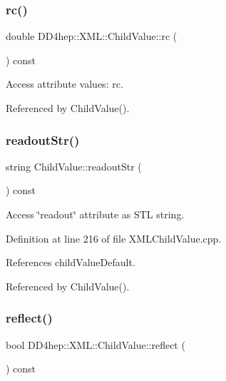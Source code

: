 \subsubsection{\texorpdfstring{rc()}{rc()}}
{\footnotesize\ttfamily double D\+D4hep\+::\+X\+M\+L\+::\+Child\+Value\+::rc (\begin{DoxyParamCaption}{ }\end{DoxyParamCaption}) const}



Access attribute values\+: rc. 



Referenced by Child\+Value().

\hypertarget{struct_d_d4hep_1_1_x_m_l_1_1_child_value_ae9202ce86bf782e1395687f7829f18b7}{}\label{struct_d_d4hep_1_1_x_m_l_1_1_child_value_ae9202ce86bf782e1395687f7829f18b7} 
\subsubsection{\texorpdfstring{readout\+Str()}{readoutStr()}}
{\footnotesize\ttfamily string Child\+Value\+::readout\+Str (\begin{DoxyParamCaption}{ }\end{DoxyParamCaption}) const}



Access \char`\"{}readout\char`\"{} attribute as S\+TL string. 



Definition at line 216 of file X\+M\+L\+Child\+Value.\+cpp.



References child\+Value\+Default.



Referenced by Child\+Value().

\hypertarget{struct_d_d4hep_1_1_x_m_l_1_1_child_value_a9e8a8556426c351b7c43754d8f632655}{}\label{struct_d_d4hep_1_1_x_m_l_1_1_child_value_a9e8a8556426c351b7c43754d8f632655} 
\subsubsection{\texorpdfstring{reflect()}{reflect()}\hspace{0.1cm}{\footnotesize\ttfamily [1/2]}}
{\footnotesize\ttfamily bool D\+D4hep\+::\+X\+M\+L\+::\+Child\+Value\+::reflect (\begin{DoxyParamCaption}{ }\end{DoxyParamCaption}) const}



